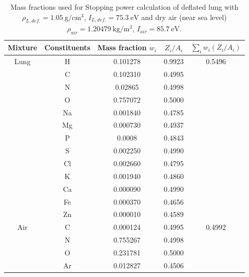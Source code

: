 \documentclass{article}
\begin{document}
\begin{table}[h]
    \centering
    \begin{tabular}{c|c|c|c|c}
        Mixture & Constituents & Mass fraction $w_i$ & $Z_i/A_i$ & $\sum_i w_i(Z_i/A_i)$ \\
        \hline
        Lung & H & 0.101278 & 0.9923 & 0.5496 \\ 
             & C & 0.102310 & 0.4995 & \\
             & N & 0.02865 & 0.4998 & \\
             & O & 0.757072 & 0.5000 & \\
             & Na & 0.001840 & 0.4785 & \\
             & Mg & 0.000730 & 0.4937 & \\
             & P & 0.0008 & 0.4843 & \\
             & S & 0.002250 & 0.4990 & \\
             & Cl & 0.002660 & 0.4795 & \\
             & K & 0.001940 & 0.4860 & \\
             & Ca & 0.000090 & 0.4990 & \\
             & Fe & 0.000370 & 0.4656 & \\
             & Zn & 0.000010 & 0.4589 & \\
        \hline
        Air & C & 0.000124 & 0.4995 & 0.4992 \\ 
            & N & 0.755267 & 0.4998 & \\
            & O & 0.231781 & 0.5000 & \\
            & Ar & 0.012827 & 0.4506 & \\
            
    \end{tabular}
    \caption{Mass fractions used for Stopping power calculation of deflated lung with $\rho_{L, def.} = \SI{1.05}{\gram\per\centi\meter\cubed}$, $I_{L, def.} = \SI{75.3}{\electronvolt}$ and dry air (near sea level) $\rho_{air} = \SI{1.20479}{\kilo\gram\per\meter\cubed}$, $I_{air} = \SI{85.7}{\electronvolt}$.}
    \label{table:stopping:lung}
\end{table}
\end{document}
